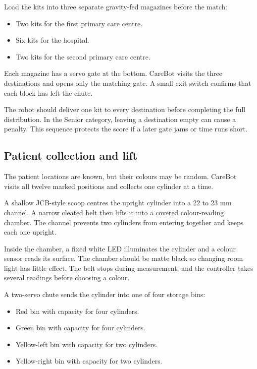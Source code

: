 \documentclass[11pt,a4paper]{article}
\begin{document}
Load the kits into three separate gravity-fed magazines before the match:

\begin{itemize}
  \item Two kits for the first primary care centre.
  \item Six kits for the hospital.
  \item Two kits for the second primary care centre.
\end{itemize}

Each magazine has a servo gate at the bottom. CareBot visits the three destinations and opens only the matching gate. A small exit switch confirms that each block has left the chute.

The robot should deliver one kit to every destination before completing the full distribution. In the Senior category, leaving a destination empty can cause a penalty. This sequence protects the score if a later gate jams or time runs short.

\subsection{Patient collection and lift}

The patient locations are known, but their colours may be random. CareBot visits all twelve marked positions and collects one cylinder at a time.

A shallow JCB-style scoop centres the upright cylinder into a 22 to 23 mm channel. A narrow cleated belt then lifts it into a covered colour-reading chamber. The channel prevents two cylinders from entering together and keeps each one upright.

Inside the chamber, a fixed white LED illuminates the cylinder and a colour sensor reads its surface. The chamber should be matte black so changing room light has little effect. The belt stops during measurement, and the controller takes several readings before choosing a colour.

A two-servo chute sends the cylinder into one of four storage bins:

\begin{itemize}
  \item Red bin with capacity for four cylinders.
  \item Green bin with capacity for four cylinders.
  \item Yellow-left bin with capacity for two cylinders.
  \item Yellow-right bin with capacity for two cylinders.
\end{itemize}
\end{document}
